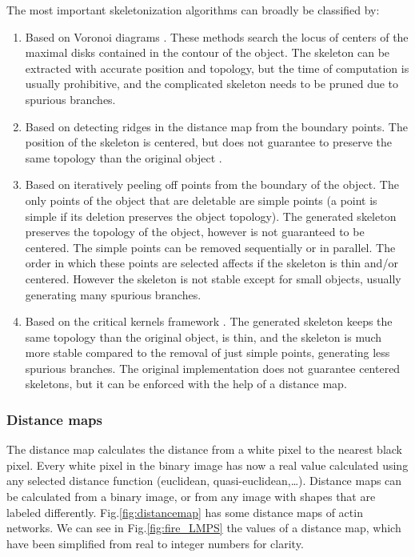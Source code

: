 The most important skeletonization algorithms can broadly be classified by:

\begin{enumerate}
  \item \label{itm:voronoi} Based on Voronoi diagrams \citep{ogniewicz_hierarchic_1995}.
    These methods search the locus of centers of the maximal disks
    contained in the contour of the object. The skeleton can be
    extracted with accurate position and topology, but the time
    of computation is usually prohibitive, and the complicated skeleton needs to be
    pruned due to spurious branches.
  \item \label{itm:ridges} Based on detecting ridges
    in the distance map from the boundary points. The
    position of the skeleton is centered, but does not guarantee to preserve
    the same topology than the original object
    \citep{ge_generation_1996}.
  \item \label{itm:simple} Based on iteratively peeling off points from the boundary of the object. The only points of the object that are deletable are simple points (a point is simple if its deletion preserves
    the object topology). The generated skeleton preserves the topology of the object, however is not guaranteed to be centered. The simple points can be removed sequentially or in parallel.
    The order in which these points are selected affects if the skeleton is thin and/or centered. However the skeleton is not stable except for small objects, usually generating many spurious branches.
  \item \label{itm:critical} Based on the critical kernels framework \cite{couprie_asymmetric_2016}. The generated skeleton keeps the same topology than the original object, is thin, and the skeleton is much more stable compared to the removal of just simple points, generating less spurious branches. The original implementation \cite{couprie_asymmetric_2016} does not guarantee centered skeletons, but it can be enforced with the help of a distance map.
\end{enumerate}

\subsubsection{Distance maps}%
\label{subsub:distance_maps}

The distance map calculates the distance from a
white pixel to the nearest black pixel. Every white pixel in the binary image
has now a real value calculated using any selected distance function (euclidean,
quasi-euclidean,\ldots ). Distance maps can be calculated from a binary image, or from
any image with shapes that are labeled differently.
Fig.\ref{fig:distancemap} has some distance maps of actin networks.
We can see in Fig.\ref{fig:fire_LMPS} the values of a distance map, which have
been simplified from real to integer numbers for clarity.

